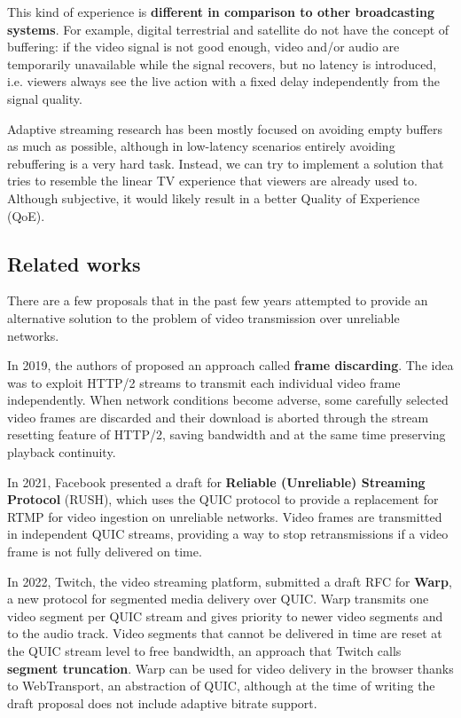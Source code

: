 This kind of experience is \textbf{different in comparison to other broadcasting systems}. For example, digital terrestrial and satellite do not have the concept of buffering: if the video signal is not good enough, video and/or audio are temporarily unavailable while the signal recovers, but no latency is introduced, i.e. viewers always see the live action with a fixed delay independently from the signal quality.

Adaptive streaming research has been mostly focused on avoiding empty buffers as much as possible, although in low-latency scenarios entirely avoiding rebuffering is a very hard task. Instead, we can try to implement a solution that tries to resemble the linear TV experience that viewers are already used to. Although subjective, it would likely result in a better Quality of Experience (QoE).

\subsection{Related works}
\label{sec:improvements/ux/related}

There are a few proposals that in the past few years attempted to provide an alternative solution to the problem of video transmission over unreliable networks.

In 2019, the authors of \cite{framediscarding} proposed an approach called \textbf{frame discarding}. The idea was to exploit HTTP/2 streams to transmit each individual video frame independently. When network conditions become adverse, some carefully selected video frames are discarded and their download is aborted through the stream resetting feature of HTTP/2, saving bandwidth and at the same time preserving playback continuity.

In 2021, Facebook presented a draft for \textbf{Reliable (Unreliable) Streaming Protocol} (RUSH), which uses the QUIC protocol to provide a replacement for RTMP for video ingestion on unreliable networks. Video frames are transmitted in independent QUIC streams, providing a way to stop retransmissions if a video frame is not fully delivered on time.\cite{rush}

In 2022, Twitch, the video streaming platform, submitted a draft RFC for \textbf{Warp}, a new protocol for segmented media delivery over QUIC. Warp transmits one video segment per QUIC stream and gives priority to newer video segments and to the audio track. Video segments that cannot be delivered in time are reset at the QUIC stream level to free bandwidth, an approach that Twitch calls \textbf{segment truncation}. Warp can be used for video delivery in the browser thanks to WebTransport, an abstraction of QUIC, although at the time of writing the draft proposal does not include adaptive bitrate support.\cite{warp}

